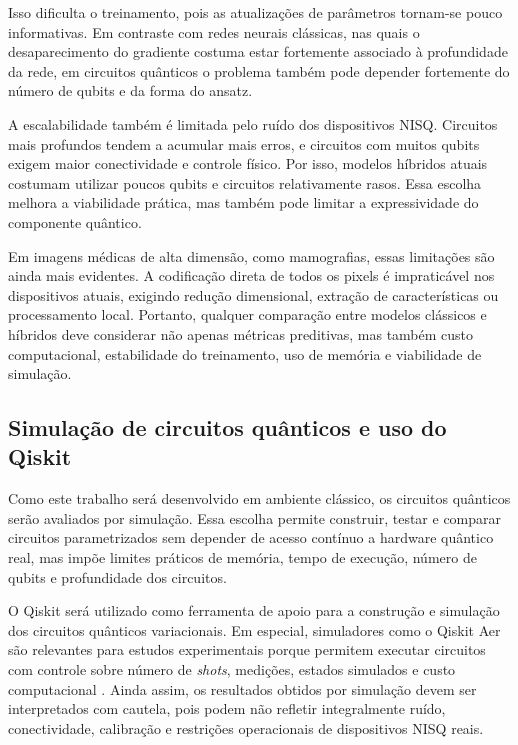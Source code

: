 \documentclass[
    12pt,
    openright,
    oneside,
    a4paper,
    english,
    brazil
]{abntex2}
\begin{document}
Isso dificulta o treinamento, pois as atualizações de parâmetros tornam-se pouco informativas. Em contraste com redes neurais clássicas, nas quais o desaparecimento do gradiente costuma estar fortemente associado à profundidade da rede, em circuitos quânticos o problema também pode depender fortemente do número de qubits e da forma do ansatz.

A escalabilidade também é limitada pelo ruído dos dispositivos NISQ. Circuitos mais profundos tendem a acumular mais erros, e circuitos com muitos qubits exigem maior conectividade e controle físico. Por isso, modelos híbridos atuais costumam utilizar poucos qubits e circuitos relativamente rasos. Essa escolha melhora a viabilidade prática, mas também pode limitar a expressividade do componente quântico.

Em imagens médicas de alta dimensão, como mamografias, essas limitações são ainda mais evidentes. A codificação direta de todos os pixels é impraticável nos dispositivos atuais, exigindo redução dimensional, extração de características ou processamento local. Portanto, qualquer comparação entre modelos clássicos e híbridos deve considerar não apenas métricas preditivas, mas também custo computacional, estabilidade do treinamento, uso de memória e viabilidade de simulação.

\subsection{Simulação de circuitos quânticos e uso do Qiskit}
\label{subsec:simulacao_circuitos_qiskit}

Como este trabalho será desenvolvido em ambiente clássico, os circuitos quânticos serão avaliados por simulação. Essa escolha permite construir, testar e comparar circuitos parametrizados sem depender de acesso contínuo a hardware quântico real, mas impõe limites práticos de memória, tempo de execução, número de qubits e profundidade dos circuitos.

O Qiskit será utilizado como ferramenta de apoio para a construção e simulação dos circuitos quânticos variacionais. Em especial, simuladores como o Qiskit Aer são relevantes para estudos experimentais porque permitem executar circuitos com controle sobre número de \textit{shots}, medições, estados simulados e custo computacional \cite{faj2023warpspeed}. Ainda assim, os resultados obtidos por simulação devem ser interpretados com cautela, pois podem não refletir integralmente ruído, conectividade, calibração e restrições operacionais de dispositivos NISQ reais.
\end{document}
